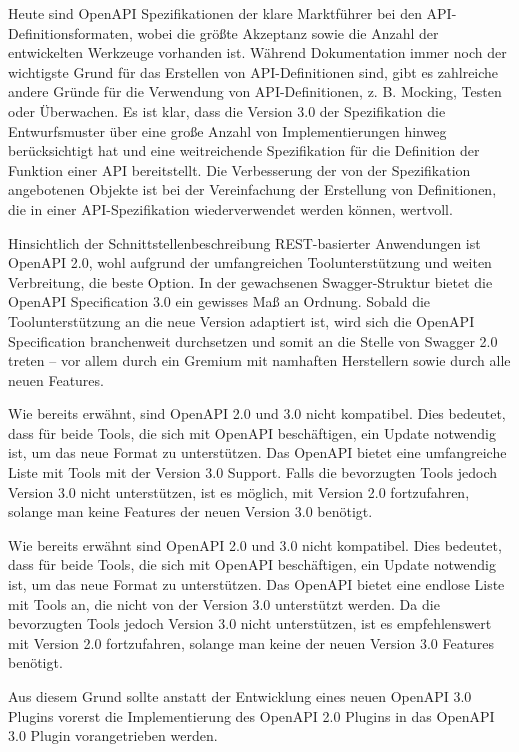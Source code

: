 Heute sind OpenAPI Spezifikationen der klare Marktführer bei den API-Definitionsformaten, wobei die größte Akzeptanz sowie die Anzahl der entwickelten Werkzeuge vorhanden ist. Während Dokumentation immer noch der wichtigste Grund für das Erstellen von API-Definitionen sind, gibt es zahlreiche andere Gründe für die Verwendung von API-Definitionen, z. B. Mocking, Testen oder Überwachen. Es ist klar, dass die Version 3.0 der Spezifikation die Entwurfsmuster über eine große Anzahl von Implementierungen hinweg berücksichtigt hat und eine weitreichende Spezifikation für die Definition der Funktion einer API bereitstellt. Die Verbesserung der von der Spezifikation angebotenen Objekte ist bei der Vereinfachung der Erstellung von Definitionen, die in einer API-Spezifikation wiederverwendet werden können, wertvoll.

Hinsichtlich der Schnittstellenbeschreibung REST-basierter Anwendungen ist OpenAPI 2.0, wohl aufgrund der umfangreichen Toolunterstützung und weiten Verbreitung, die beste Option. In der gewachsenen Swagger-Struktur bietet die OpenAPI Specification 3.0 ein gewisses Maß an Ordnung. Sobald die Toolunterstützung an die neue Version adaptiert ist, wird sich die OpenAPI Specification branchenweit durchsetzen und somit an die Stelle von Swagger 2.0 treten – vor allem durch ein Gremium mit namhaften Herstellern sowie durch alle neuen Features.

Wie bereits erwähnt, sind OpenAPI 2.0 und 3.0 nicht kompatibel. Dies bedeutet, dass für beide Tools, die sich mit OpenAPI beschäftigen, ein Update notwendig ist, um das neue Format zu unterstützen. Das OpenAPI bietet eine umfangreiche Liste mit Tools mit der Version 3.0 Support. Falls die bevorzugten Tools jedoch Version 3.0 nicht unterstützen, ist es möglich, mit Version 2.0 fortzufahren, solange man keine Features der neuen Version 3.0 benötigt.

Wie bereits erwähnt sind OpenAPI 2.0 und 3.0 nicht kompatibel. Dies bedeutet, dass für beide Tools, die sich mit OpenAPI beschäftigen, ein Update notwendig ist, um das neue Format zu unterstützen. Das OpenAPI bietet eine endlose Liste mit Tools an, die nicht von der Version 3.0 unterstützt werden. Da die bevorzugten Tools jedoch Version 3.0 nicht unterstützen, ist es empfehlenswert mit Version 2.0 fortzufahren, solange man keine der neuen Version 3.0 Features benötigt.

Aus diesem Grund sollte anstatt der Entwicklung eines neuen OpenAPI 3.0 Plugins vorerst die Implementierung des OpenAPI 2.0 Plugins in das OpenAPI 3.0 Plugin vorangetrieben werden.






